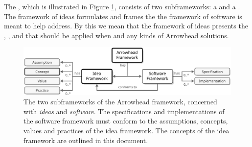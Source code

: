 %
%

The , which is illustrated in Figure \ref{fig:framework}, consists of two subframeworks: a  and a .
The framework of ideas formulates and frames the  the framework of software is meant to help address.
By this we mean that the framework of ideas presents the , ,  and  that should be applied when  and  any kinds of Arrowhead solutions.

\begin{figure}[ht!]
  \centering
  \includegraphics[scale=0.9]{figures/framework}
  \caption{
    The two subframeworks of the Arrowhead framework, concerned with \textit{ideas} and \textit{software}.
    The specifications and implementations of the software framework must conform to the assumptions, concepts, values and practices of the idea framework.
    The concepts of the idea framework are outlined in this document.
  }
  \label{fig:framework}
\end{figure}

